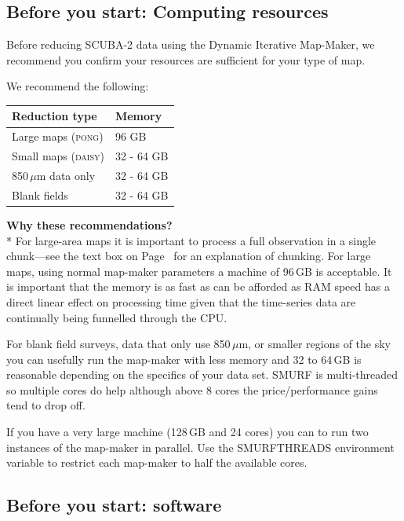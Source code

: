 \documentclass[twoside,11pt]{article}
\newcommand{\htmlref}[2]{#1}
\newcommand{\latexhtml}[2]{#1}
\newcommand{\xlabel}[1]{}
\renewcommand{\_}{\texttt{\symbol{95}}}
\begin{document}
\subsection{\xlabel{computing}Before you start: Computing resources}

Before reducing SCUBA-2 data using the Dynamic Iterative Map-Maker, we
recommend you confirm your resources are sufficient for your type of
map.

We recommend the following:\\
\begin{table}[h!]
\centering
\begin{tabular}{ll}
\hline
\textbf{Reduction type} &\textbf{Memory} \\
\hline
Large maps (\textsc{pong})& 96 GB\\
Small maps (\textsc{daisy})&32 - 64 GB\\
850\,$\mu$m data only&32 - 64 GB\\
Blank fields&32 - 64 GB\\
\hline
\end{tabular}
\end{table}

\textbf{Why these recommendations?}\\*
For large-area maps it is important to process a full observation in a
single chunk---see the text box on
\latexhtml{Page~\pageref{page:text}}{\htmlref{What to look
for}{box:chunk}} for an explanation of chunking. For large maps, using normal
map-maker parameters a machine of 96\,GB is acceptable. It is
important that the memory is as fast as can be afforded as RAM speed
has a direct linear effect on processing time given that the
time-series data are continually being funnelled through the CPU.

For blank field surveys, data that only use 850\,$\mu$m, or smaller
regions of the sky you can usefully run the map-maker with less memory
and 32 to 64\,GB is reasonable depending on the specifics of your data
set. SMURF is multi-threaded so multiple cores do help although above
8 cores the price/performance gains tend to drop off.

If you have a very large machine (128\,GB and 24 cores) you can to run
two instances of the map-maker in parallel. Use the SMURF\_THREADS
environment variable to restrict each map-maker to half the available
cores.


\subsection{\xlabel{software}Before you start: software}
\end{document}
